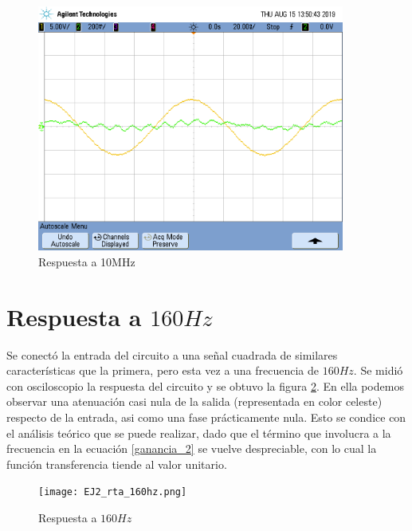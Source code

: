  \begin{figure}[h!]
    \centering
    \includegraphics[width=0.9\textwidth]{EJ2_rta_alta_frec.png}
    \caption{Respuesta a 10MHz}
    \label{fig:noise_2}
\end{figure}
 
\section{Respuesta a $160Hz$}

Se conect\'o la entrada del circuito a una se\~nal cuadrada de similares caracter\'isticas que la primera, pero esta vez a una frecuencia de $160Hz$. Se midi\'o con osciloscopio la respuesta del circuito y se obtuvo la figura \ref{fig:160hz_2}. En ella podemos observar una atenuaci\'on casi nula de la salida (representada en color celeste) respecto de la entrada, asi como una fase pr\'acticamente nula. Esto se condice con el an\'alisis te\'orico que se puede realizar, dado que el t\'ermino que involucra a la frecuencia en la ecuaci\'on \ref{ganancia_2} se vuelve despreciable, con lo cual la funci\'on transferencia tiende al valor unitario.

\begin{figure}[h!]
    \centering
    \texttt{[image: EJ2\_rta\_160hz.png]}
    \caption{Respuesta a $160Hz$}
    \label{fig:160hz_2} 
\end{figure}

